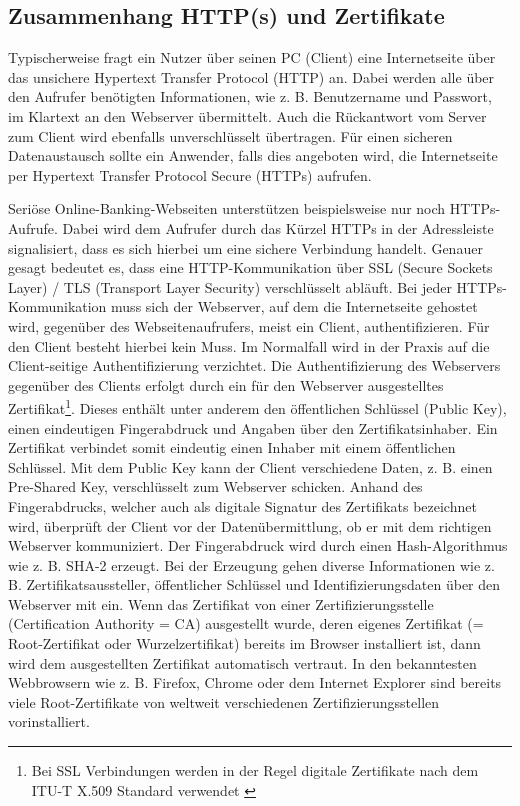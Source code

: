 \subsection{Zusammenhang HTTP(s) und Zertifikate}
\label{sec:HTTPs}
Typischerweise fragt ein Nutzer über seinen PC (Client) eine Internetseite über das unsichere Hypertext Transfer Protocol (HTTP) an. Dabei werden alle über den Aufrufer benötigten Informationen, wie z. B. Benutzername und Passwort, im Klartext an den Webserver übermittelt. Auch die Rückantwort vom Server zum Client wird ebenfalls unverschlüsselt übertragen. Für einen sicheren Datenaustausch sollte ein Anwender, falls dies angeboten wird, die Internetseite per Hypertext Transfer Protocol Secure (HTTPs) aufrufen. \cite[vgl.]{RFC7230} 

Seriöse Online-Banking-Webseiten unterstützen beispielsweise nur noch HTTPs-Aufrufe. Dabei wird dem Aufrufer durch das Kürzel HTTPs in der Adressleiste signalisiert, dass es sich hierbei um eine sichere Verbindung handelt. Genauer gesagt bedeutet es, dass eine HTTP-Kommunikation über SSL (Secure Sockets Layer) / TLS (Transport Layer Security) verschlüsselt abläuft. Bei jeder HTTPs-Kommunikation muss sich der Webserver, auf dem die Internetseite gehostet wird, gegenüber des Webseitenaufrufers, meist ein Client, authentifizieren. Für den Client besteht hierbei kein Muss. Im Normalfall wird in der Praxis auf die Client-seitige Authentifizierung verzichtet. Die Authentifizierung des Webservers gegenüber des Clients erfolgt durch ein für den Webserver ausgestelltes Zertifikat\footnote{Bei SSL Verbindungen werden in der Regel digitale Zertifikate nach dem ITU-T X.509 Standard verwendet \cite[vgl.]{RFC6101}}. \cite[vgl.]{RFC2818} 
Dieses enthält unter anderem den öffentlichen Schlüssel (Public Key), einen eindeutigen Fingerabdruck und Angaben über den Zertifikatsinhaber. \cite[vgl.]{x.509} Ein Zertifikat verbindet somit eindeutig einen Inhaber mit einem öffentlichen Schlüssel. Mit dem Public Key kann der Client verschiedene Daten, z. B. einen Pre-Shared Key, verschlüsselt zum Webserver schicken. Anhand des Fingerabdrucks, welcher auch als digitale Signatur des Zertifikats bezeichnet wird, überprüft der Client vor der Datenübermittlung, ob er mit dem richtigen Webserver kommuniziert. Der Fingerabdruck wird durch einen Hash-Algorithmus wie z. B. SHA-2 erzeugt. Bei der Erzeugung gehen diverse Informationen wie z. B. Zertifikatsaussteller, öffentlicher Schlüssel und Identifizierungsdaten über den Webserver mit ein. \cite[vgl.]{RFC2459}
Wenn das Zertifikat von einer Zertifizierungsstelle (Certification Authority = CA) ausgestellt wurde, deren eigenes Zertifikat (= Root-Zertifikat oder Wurzelzertifikat) bereits im Browser installiert ist, dann wird dem ausgestellten Zertifikat automatisch vertraut. In den bekanntesten Webbrowsern wie z. B. Firefox, Chrome oder dem Internet Explorer sind bereits viele Root-Zertifikate von weltweit verschiedenen Zertifizierungsstellen vorinstalliert.
